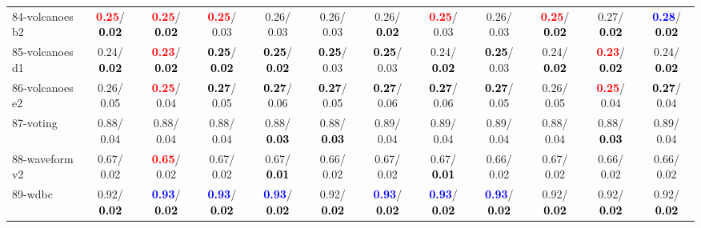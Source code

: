 \begin{table}[h]
\begin{center}
{\begin{tabular}{lc|c|c|c|c|c|c|c|c|c|c}
84-volcanoes b2 & \textcolor{red}{\textbf{  0.25}}/\textcolor{black}{\textbf{  0.02}} & \textcolor{red}{\textbf{  0.25}}/\textcolor{black}{\textbf{  0.02}} & \textcolor{red}{\textbf{  0.25}}/  0.03 &   0.26/  0.03 &   0.26/  0.03 &   0.26/\textcolor{black}{\textbf{  0.02}} & \textcolor{red}{\textbf{  0.25}}/  0.03 &   0.26/  0.03 & \textcolor{red}{\textbf{  0.25}}/\textcolor{black}{\textbf{  0.02}} &   0.27/\textcolor{black}{\textbf{  0.02}} & \textcolor{blue}{\textbf{  0.28}}/\textcolor{black}{\textbf{  0.02}} \\
85-volcanoes d1 &   0.24/\textcolor{black}{\textbf{  0.02}} & \textcolor{red}{\textbf{  0.23}}/\textcolor{black}{\textbf{  0.02}} & \textcolor{black}{\textbf{  0.25}}/\textcolor{black}{\textbf{  0.02}} & \textcolor{black}{\textbf{  0.25}}/\textcolor{black}{\textbf{  0.02}} & \textcolor{black}{\textbf{  0.25}}/  0.03 & \textcolor{black}{\textbf{  0.25}}/  0.03 &   0.24/\textcolor{black}{\textbf{  0.02}} & \textcolor{black}{\textbf{  0.25}}/  0.03 &   0.24/\textcolor{black}{\textbf{  0.02}} & \textcolor{red}{\textbf{  0.23}}/\textcolor{black}{\textbf{  0.02}} &   0.24/\textcolor{black}{\textbf{  0.02}} \\ \hline
86-volcanoes e2 &   0.26/  0.05 & \textcolor{red}{\textbf{  0.25}}/  0.04 & \textcolor{black}{\textbf{  0.27}}/  0.05 & \textcolor{black}{\textbf{  0.27}}/  0.06 & \textcolor{black}{\textbf{  0.27}}/  0.05 & \textcolor{black}{\textbf{  0.27}}/  0.06 & \textcolor{black}{\textbf{  0.27}}/  0.06 & \textcolor{black}{\textbf{  0.27}}/  0.05 &   0.26/  0.05 & \textcolor{red}{\textbf{  0.25}}/  0.04 & \textcolor{black}{\textbf{  0.27}}/  0.04 \\
87-voting &   0.88/  0.04 &   0.88/  0.04 &   0.88/  0.04 &   0.88/\textcolor{black}{\textbf{  0.03}} &   0.88/\textcolor{black}{\textbf{  0.03}} &   0.89/  0.04 &   0.89/  0.04 &   0.89/  0.04 &   0.88/  0.04 &   0.88/\textcolor{black}{\textbf{  0.03}} &   0.89/  0.04 \\
88-waveform v2 &   0.67/  0.02 & \textcolor{red}{\textbf{  0.65}}/  0.02 &   0.67/  0.02 &   0.67/\textcolor{black}{\textbf{  0.01}} &   0.66/  0.02 &   0.67/  0.02 &   0.67/\textcolor{black}{\textbf{  0.01}} &   0.66/  0.02 &   0.67/  0.02 &   0.66/  0.02 &   0.66/  0.02 \\
89-wdbc &   0.92/\textcolor{black}{\textbf{  0.02}} & \textcolor{blue}{\textbf{  0.93}}/\textcolor{black}{\textbf{  0.02}} & \textcolor{blue}{\textbf{  0.93}}/\textcolor{black}{\textbf{  0.02}} & \textcolor{blue}{\textbf{  0.93}}/\textcolor{black}{\textbf{  0.02}} &   0.92/\textcolor{black}{\textbf{  0.02}} & \textcolor{blue}{\textbf{  0.93}}/\textcolor{black}{\textbf{  0.02}} & \textcolor{blue}{\textbf{  0.93}}/\textcolor{black}{\textbf{  0.02}} & \textcolor{blue}{\textbf{  0.93}}/\textcolor{black}{\textbf{  0.02}} &   0.92/\textcolor{black}{\textbf{  0.02}} &   0.92/\textcolor{black}{\textbf{  0.02}} &   0.92/\textcolor{black}{\textbf{  0.02}} \\

\end{tabular}}
\end{center}
\end{table}
